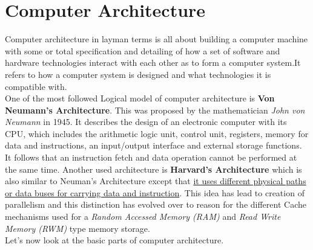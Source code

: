 \chapter{Computer Architecture}
\graphicspath{ {./images/} }


Computer architecture in layman terms is all about building a computer machine with some or total specification and detailing of how a set of software and hardware technologies interact with each other as to form a computer system.It refers to how a computer system is designed and what technologies it is compatible with.\\

One of the most followed Logical model of computer architecture is \textbf{Von Neumann's Architecture}. This was proposed by the mathematician \textit{John von Neumann} in 1945. It describes the design of an electronic computer with its CPU, which includes the arithmetic logic unit, control unit, registers, memory for data and instructions, an input/output interface and external storage functions. It follows that an instruction fetch and data operation cannot be performed at the same time. Another used architecture is \textbf{Harvard's Architecture} which is also similar to Neuman's Architecture except that \underline{it uses different physical paths or data buses for carrying data and instruction}. This idea has lead to creation of parallelism and this distinction has evolved over to reason for the different Cache mechanisms used for a \textit{Random Accessed Memory (RAM)} and \textit{Read Write Memory (RWM)} type memory storage.\\

Let's now look at the basic parts of computer architecture.\\   


